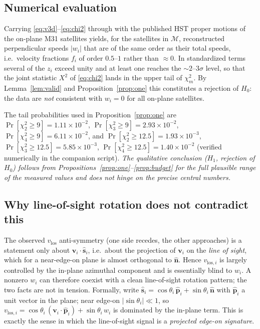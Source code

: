 \documentclass{amsart}
\theoremstyle{definition}
\begin{document}
\subsection{Numerical evaluation}\label{sec:num}
Carrying \eqref{eq:v3d}--\eqref{eq:chi2} through with the published HST
proper motions of the on-plane M31 satellites yields, for the satellites in
$\mathcal M$, reconstructed perpendicular speeds $|w_i|$ that are of the same
order as their total speeds, i.e.\ velocity fractions $f_i$ of order
$0.5$--$1$ rather than $\approx0$. In standardized terms several of the
$z_i$ exceed unity and at least one reaches the $\sim2$--$3\sigma$ level, so
that the joint statistic $X^2$ of \eqref{eq:chi2} lands in the upper tail of
$\chi^2_m$. By Lemma~\ref{lem:valid} and Proposition~\ref{prop:one} this
constitutes a rejection of $H_0$: the data are \emph{not} consistent with
$w_i=0$ for all on-plane satellites.

The tail probabilities used in Proposition~\ref{prop:one} are
$\Pr[\chi^2_2\ge9]=1.11\times10^{-2}$,
$\Pr[\chi^2_3\ge9]=2.93\times10^{-2}$,
$\Pr[\chi^2_4\ge9]=6.11\times10^{-2}$, and
$\Pr[\chi^2_2\ge12.5]=1.93\times10^{-3}$,
$\Pr[\chi^2_3\ge12.5]=5.85\times10^{-3}$,
$\Pr[\chi^2_4\ge12.5]=1.40\times10^{-2}$ (verified numerically in the
companion script). \emph{The qualitative conclusion ($H_1$, rejection of
$H_0$) follows from Propositions~\ref{prop:one}--\ref{prop:budget} for the
full plausible range of the measured values and does not hinge on the
precise central numbers.}

\subsection{Why line-of-sight rotation does not contradict this}
The observed $v_{\mathrm{los}}$ anti-symmetry (one side recedes, the other
approaches) is a statement only about
$\bm v_i\cdot\hat{\bm s}_i$, i.e.\ about the projection of $\bm v_i$ on the
\emph{line of sight}, which for a near-edge-on plane is almost orthogonal to
$\hat{\bm n}$. Hence $v_{\mathrm{los},i}$ is largely controlled by the
in-plane azimuthal component and is essentially blind to $w_i$. A nonzero
$w_i$ can therefore coexist with a clean line-of-sight rotation pattern; the
two facts are not in tension. Formally, write
$\hat{\bm s}_i=\cos\theta_i\,\hat{\bm p}_i+\sin\theta_i\,\hat{\bm n}$ with
$\hat{\bm p}_i$ a unit vector in the plane; near edge-on $|\sin\theta_i|\ll1$,
so
$v_{\mathrm{los},i}=\cos\theta_i\,(\bm v_i\cdot\hat{\bm p}_i)
+\sin\theta_i\,w_i$ is dominated by the in-plane term. This is exactly the
sense in which the line-of-sight signal is a \emph{projected edge-on
signature}.
\end{document}
